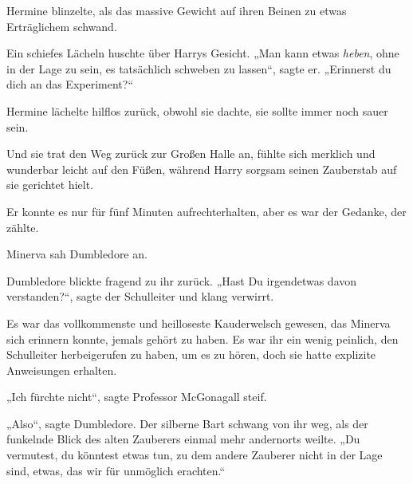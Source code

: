 Hermine blinzelte, als das massive Gewicht auf ihren Beinen zu etwas Erträglichem schwand.

Ein schiefes Lächeln huschte über Harrys Gesicht.
„Man kann etwas \emph{heben}, ohne in der Lage zu sein, es tatsächlich schweben zu lassen“, sagte er.
„Erinnerst du dich an das Experiment?“

Hermine lächelte hilflos zurück, obwohl sie dachte, sie sollte immer noch sauer sein.

Und sie trat den Weg zurück zur Großen Halle an, fühlte sich merklich und wunderbar leicht auf den Füßen, während Harry sorgsam seinen Zauberstab auf sie gerichtet hielt.

Er konnte es nur für fünf Minuten aufrechterhalten, aber es war der Gedanke, der zählte.

\later

Minerva sah Dumbledore an.

Dumbledore blickte fragend zu ihr zurück.
„Hast Du irgendetwas davon verstanden?“, sagte der Schulleiter und klang verwirrt.

Es war das vollkommenste und heilloseste Kauderwelsch gewesen, das Minerva sich erinnern konnte, jemals gehört zu haben. Es war ihr ein wenig peinlich, den Schulleiter herbeigerufen zu haben, um es zu hören, doch sie hatte explizite Anweisungen erhalten.

„Ich fürchte nicht“, sagte Professor McGonagall steif.

„Also“, sagte Dumbledore. Der silberne Bart schwang von ihr weg, als der funkelnde Blick des alten Zauberers einmal mehr andernorts weilte.
„Du vermutest, du könntest etwas tun, zu dem andere Zauberer nicht in der Lage sind, etwas, das wir für unmöglich erachten.“

